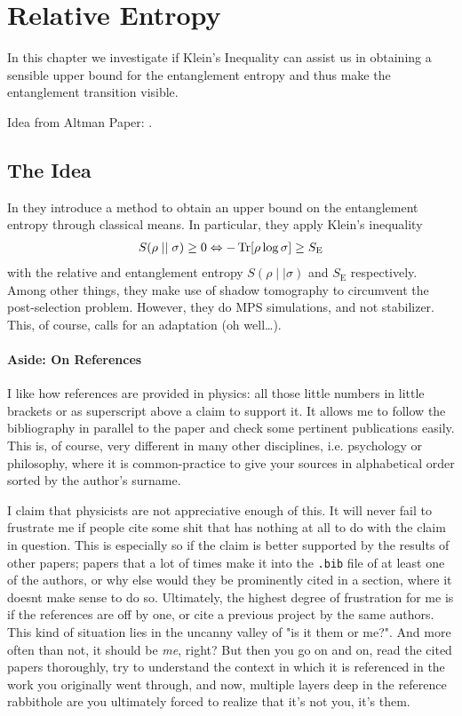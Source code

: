 \chapter{Relative Entropy}
\label{ch:rel-ent}

In this chapter we investigate if Klein's Inequality can assist us in obtaining
a sensible upper bound for the entanglement entropy and thus make the
entanglement transition visible.

Idea from Altman Paper:
\cite{garrattProbingPostmeasurementEntanglement2023}.
\section{The Idea}
In \cite{garrattProbingPostmeasurementEntanglement2023} they introduce a method to obtain an upper bound on the
entanglement entropy through classical means. In particular, they apply Klein's
inequality \cite{nielsenQuantumComputationQuantum2010}
\begin{align}
  \label{eq:kleins-ineq}
  S(\rho \mid\mid \sigma) \geq 0 \Leftrightarrow -\Tr[\rho\log\sigma]\geq
  S_\mathrm{E}
\end{align}
with the relative and entanglement entropy $S(\rho\mid\mid\sigma)$ and
$S_\mathrm{E}$ respectively.
Among other things, they make use of shadow tomography to circumvent the
post-selection problem. 
However, they do MPS simulations, and not stabilizer. This, of course, calls
for an adaptation (oh well\ldots).

\subsubsection{Aside: On References}
I like how references are provided in physics: all those little numbers in
little brackets or as superscript above a claim to support it. It allows me to
follow the bibliography in parallel to the paper and check some pertinent
publications easily. This is, of course, very different in many other
disciplines, i.e. psychology or philosophy, where it is common-practice to give
your sources in alphabetical order sorted by the author's surname.

I claim that physicists are not appreciative enough of this. It will never fail
to frustrate me if people cite some shit that has nothing at all to do with the
claim in question. This is especially so if the claim is better supported by
the results of other papers; papers that a lot of times make it into the
\texttt{.bib} file of at least one of the authors, or why else would they be
prominently cited in a section, where it doesnt make sense to do so.
Ultimately, the highest degree of frustration for me is if the references are
off by one, or cite a previous project by the same authors. This kind of
situation lies in the uncanny valley of "is it them or me?". And more often
than not, it should be \emph{me}, right? But then you go on and on, read the
cited papers thoroughly, try to understand the context in which it is
referenced in the work you originally went through, and now, multiple layers
deep in the reference rabbithole are you ultimately forced to realize that it's
not you, it's them. 

